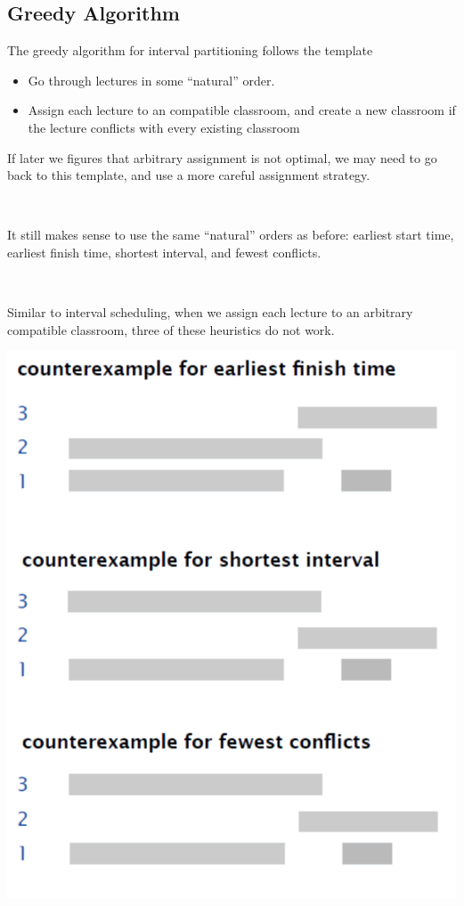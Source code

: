 \subsection{Greedy Algorithm}

The greedy algorithm for interval partitioning follows the template

\begin{itemize}
    \item Go through lectures in some ``natural'' order.
    \item Assign each lecture to an  compatible classroom, and create a new classroom if the lecture conflicts with every existing classroom
\end{itemize}

If later we figures that arbitrary assignment is not optimal, we may need to go back to this template, and use a more careful assignment strategy.

\begin{minipage}[t]{0.6\linewidth}
    {~~~}

    It still makes sense to use the same ``natural'' orders as before: earliest start time, earliest finish time, shortest interval, and fewest conflicts.

    {~~~}

    Similar to interval scheduling, when we assign each lecture to an arbitrary compatible classroom, three of these heuristics do not work.
\end{minipage}
\hfil%
\begin{minipage}[t]{0.35\linewidth}
    \begin{center}
        \includegraphics[width=0.9\linewidth,valign=t]{figures/interval-scheduling-counterexample.png}
    \end{center}
\end{minipage}

